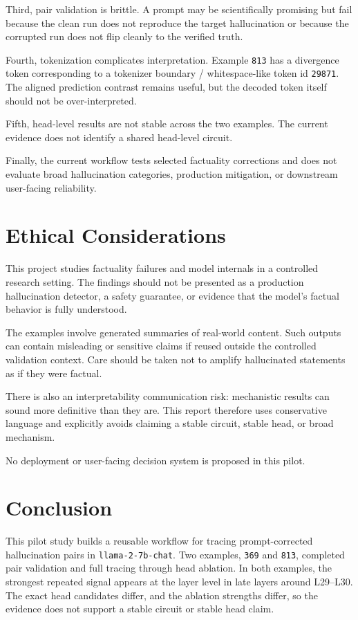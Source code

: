 \documentclass[11pt]{article}
\begin{document}
Third, pair validation is brittle. A prompt may be scientifically promising but fail because the clean run does not reproduce the target hallucination or because the corrupted run does not flip cleanly to the verified truth.

Fourth, tokenization complicates interpretation. Example \texttt{813} has a divergence token corresponding to a tokenizer boundary / whitespace-like token id \texttt{29871}. The aligned prediction contrast remains useful, but the decoded token itself should not be over-interpreted.

Fifth, head-level results are not stable across the two examples. The current evidence does not identify a shared head-level circuit.

Finally, the current workflow tests selected factuality corrections and does not evaluate broad hallucination categories, production mitigation, or downstream user-facing reliability.

\section{Ethical Considerations}

This project studies factuality failures and model internals in a controlled research setting. The findings should not be presented as a production hallucination detector, a safety guarantee, or evidence that the model's factual behavior is fully understood.

The examples involve generated summaries of real-world content. Such outputs can contain misleading or sensitive claims if reused outside the controlled validation context. Care should be taken not to amplify hallucinated statements as if they were factual.

There is also an interpretability communication risk: mechanistic results can sound more definitive than they are. This report therefore uses conservative language and explicitly avoids claiming a stable circuit, stable head, or broad mechanism.

No deployment or user-facing decision system is proposed in this pilot.

\section{Conclusion}

This pilot study builds a reusable workflow for tracing prompt-corrected hallucination pairs in \texttt{llama-2-7b-chat}. Two examples, \texttt{369} and \texttt{813}, completed pair validation and full tracing through head ablation. In both examples, the strongest repeated signal appears at the layer level in late layers around L29--L30. The exact head candidates differ, and the ablation strengths differ, so the evidence does not support a stable circuit or stable head claim.
\end{document}
